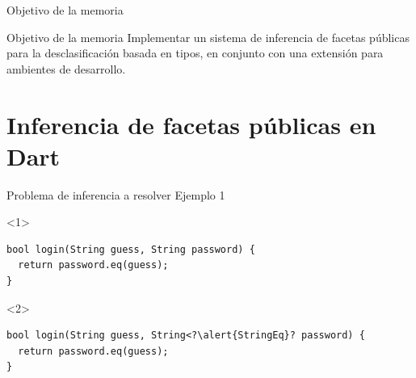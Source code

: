 \documentclass[aspectratio=169,18pt]{beamer}
\begin{document}
\begin{frame}[fragile]{Objetivo de la memoria}
	\begin{block}{Objetivo de la memoria}
		Implementar un sistema de inferencia de facetas públicas para la desclasificación basada en tipos, en conjunto con una extensión para ambientes de desarrollo.
	\end{block}
\end{frame}

\section{Inferencia de facetas públicas en Dart}

\begin{frame}[fragile]{Problema de inferencia a resolver}
	Ejemplo 1 \\
	\vspace{1cm}
	\begin{onlyenv}
\begin{lstlisting}[escapechar=?,basicstyle=\fontsize{10}{10}\ttfamily]
bool login(String guess, String password) {
  return password.eq(guess);
}
\end{lstlisting}
	\end{onlyenv}
	\begin{onlyenv}
\begin{lstlisting}[escapechar=?,basicstyle=\fontsize{10}{10}\ttfamily]
bool login(String guess, String<?\alert{StringEq}? password) {
  return password.eq(guess);
}


\end{lstlisting}
\end{onlyenv}
\end{frame}
\end{document}
